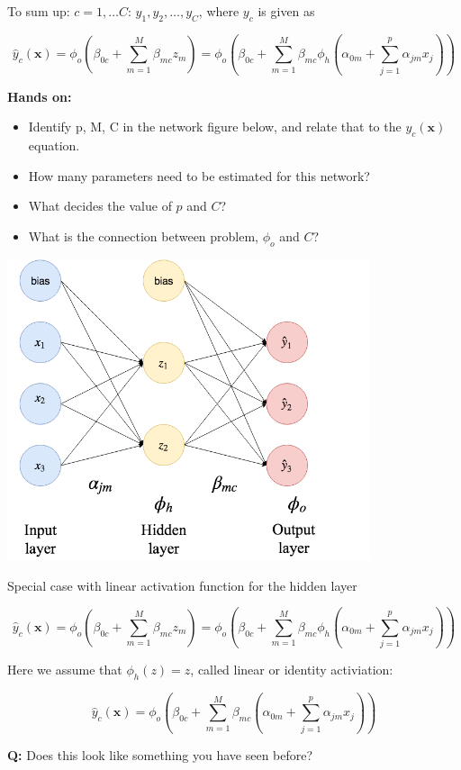 \documentclass[10pt,ignorenonframetext,]{beamer}
\providecommand{\tightlist}{%
  \setlength{\itemsep}{0pt}\setlength{\parskip}{0pt}}
\begin{document}
\begin{frame}

To sum up: \(c=1,\ldots C\): \(y_1, y_2, \ldots, y_C\), where \(y_c\) is
given as

\[
\hat{y}_c({\boldsymbol x})=\phi_o(\beta_{0c}+\sum_{m=1}^M \beta_{mc}z_{m})=\phi_o(\beta_{0c}+\sum_{m=1}^M \beta_{mc}\phi_h(\alpha_{0m}+\sum_{j=1}^p \alpha_{jm}x_{j}))
\]

\textbf{Hands on:}

\begin{itemize}
\tightlist
\item
  Identify p, M, C in the network figure below, and relate that to the
  \(y_{c}({\boldsymbol x})\) equation.
\item
  How many parameters need to be estimated for this network?
\item
  What decides the value of \(p\) and \(C\)?
\item
  What is the connection between problem, \(\phi_o\) and \(C\)?
\end{itemize}

\end{frame}

\begin{frame}

\centering
\includegraphics[width=0.80000\textwidth]{drawNNp3h2o3.png}

\end{frame}

\begin{frame}

\begin{block}{Special case with linear activation function for the
hidden layer}

\[
\hat{y}_c({\boldsymbol x})=\phi_o(\beta_{0c}+\sum_{m=1}^M \beta_{mc}z_{m})=\phi_o(\beta_{0c}+\sum_{m=1}^M \beta_{mc}\phi_h(\alpha_{0m}+\sum_{j=1}^p \alpha_{jm}x_{j}))
\]

Here we assume that \(\phi_h(z)=z\), called linear or identity
activiation:

\[
\hat{y}_c({\boldsymbol x})=\phi_o(\beta_{0c}+\sum_{m=1}^M \beta_{mc}(\alpha_{0m}+\sum_{j=1}^p \alpha_{jm}x_{j}))
\]

\textbf{Q:} Does this look like something you have seen before?

\end{block}

\end{frame}
\end{document}
